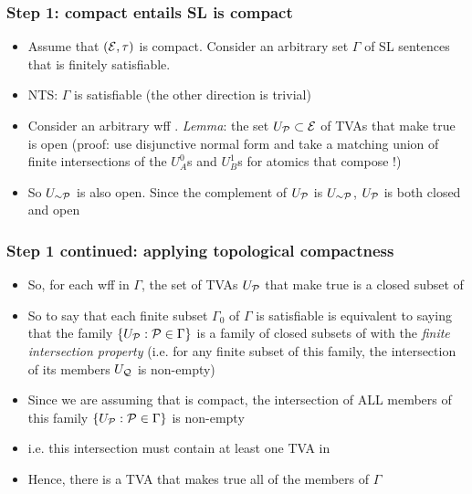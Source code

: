 \begin{frame}
\frametitle{Step 1:  compact entails SL is compact}

\begin{itemize}[<+->]

\item Assume that $(\mathcal{E}, \tau)$ is compact. Consider an arbitrary set $\Gamma$ of SL sentences that is finitely satisfiable. 
\item[] NTS:  $\Gamma$ is satisfiable (the other direction is trivial)

\item Consider an arbitrary wff . \textit{Lemma}: the set $U_{\mathcal{P}} \subset \mathcal{E}$ of TVAs that make  true is open (proof: use disjunctive normal form and take a matching union of finite intersections of the $U^0_A$s and $U^1_B$s for atomics that compose !)

\item So $U_{\enot \metav{P}}$ is also open. Since the complement of  $U_{\mathcal{P}}$ is $U_{\enot \metav{P}}$, $U_{\mathcal{P}}$ is both closed and open 

\end{itemize}
\end{frame}

\begin{frame}
\frametitle{Step 1 continued: applying topological compactness}

\begin{itemize}[<+->]

\item So, for each wff  in $\Gamma$, the set of TVAs $U_{\mathcal{P}}$ that make  true is a closed subset of 

\item So to say that each finite subset $\Gamma_0$ of $\Gamma$ is satisfiable is equivalent to saying that the family $\{  U_{\mathcal{P}}:  \mathcal{P} \in \Gamma \}$ is a family of closed subsets of   with the \textit{finite intersection property} (i.e. for any finite subset of this family, the intersection of its members $U_{\mathcal{Q}}$ is non-empty)

\item Since we are assuming that  is compact, the intersection of ALL members of this family $\{  U_{\mathcal{P}}:  \mathcal{P} \in \Gamma \}$ is non-empty

\item i.e. this intersection must contain at least one TVA in 

\item Hence, there is a TVA that makes true all of the members of $\Gamma$ 

\end{itemize}
\end{frame}


